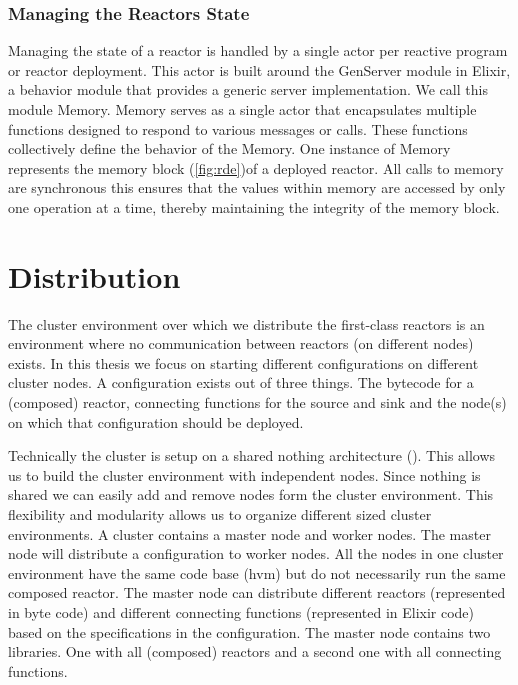 \documentclass[a4paper]{book}
\begin{document}
\subsection{Managing the Reactors State}
Managing the state of a reactor is handled by a single actor per reactive program or reactor deployment. This actor is built around the GenServer module in Elixir, a behavior module that provides a generic server implementation. We call this module Memory. Memory serves as a single actor that encapsulates multiple functions designed to respond to various messages or calls. These functions collectively define the behavior of the Memory. One instance of Memory represents the memory block (\ref{fig:rde})of a deployed reactor.
All calls to memory are synchronous this ensures that the values within memory are accessed by only one operation at a time, thereby maintaining the integrity of the memory block.

\chapter{Distribution} \label{sec:distribution}
The cluster environment over which we distribute the first-class reactors is an environment where no communication between reactors (on different nodes) exists. In this thesis we focus on starting  different configurations on different cluster nodes. A configuration exists out of three things. The bytecode for a (composed) reactor, connecting functions for the source and sink and the node(s) on which that configuration should be deployed. 

Technically the cluster is setup on a shared nothing architecture (\cite{DBLP:journals/debu/Stonebraker86}). This allows us to build the cluster environment with independent nodes. Since nothing is shared we can easily add and remove nodes form the cluster environment. This flexibility and modularity allows us to organize different sized cluster environments. A cluster contains a master node and worker nodes. The master node will distribute a configuration to worker nodes. All the nodes in one cluster environment have the same code base (hvm) but do not necessarily run the same composed reactor. The master node can distribute different reactors (represented in byte code) and different connecting functions (represented in Elixir code) based on the specifications in the configuration. The master node contains two libraries. One with all (composed) reactors and a second one with all connecting functions. 
\end{document}
